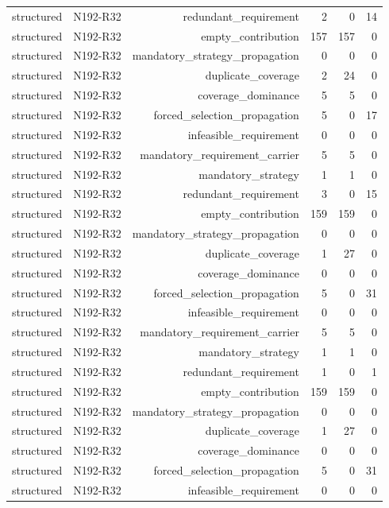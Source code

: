 {\begin{longtable}{lrrrrr}
structured & N192-R32 & redundant\_requirement & 2 & 0 & 14 \\
structured & N192-R32 & empty\_contribution & 157 & 157 & 0 \\
structured & N192-R32 & mandatory\_strategy\_propagation & 0 & 0 & 0 \\
structured & N192-R32 & duplicate\_coverage & 2 & 24 & 0 \\
structured & N192-R32 & coverage\_dominance & 5 & 5 & 0 \\
structured & N192-R32 & forced\_selection\_propagation & 5 & 0 & 17 \\
structured & N192-R32 & infeasible\_requirement & 0 & 0 & 0 \\
structured & N192-R32 & mandatory\_requirement\_carrier & 5 & 5 & 0 \\
structured & N192-R32 & mandatory\_strategy & 1 & 1 & 0 \\
structured & N192-R32 & redundant\_requirement & 3 & 0 & 15 \\
structured & N192-R32 & empty\_contribution & 159 & 159 & 0 \\
structured & N192-R32 & mandatory\_strategy\_propagation & 0 & 0 & 0 \\
structured & N192-R32 & duplicate\_coverage & 1 & 27 & 0 \\
structured & N192-R32 & coverage\_dominance & 0 & 0 & 0 \\
structured & N192-R32 & forced\_selection\_propagation & 5 & 0 & 31 \\
structured & N192-R32 & infeasible\_requirement & 0 & 0 & 0 \\
structured & N192-R32 & mandatory\_requirement\_carrier & 5 & 5 & 0 \\
structured & N192-R32 & mandatory\_strategy & 1 & 1 & 0 \\
structured & N192-R32 & redundant\_requirement & 1 & 0 & 1 \\
structured & N192-R32 & empty\_contribution & 159 & 159 & 0 \\
structured & N192-R32 & mandatory\_strategy\_propagation & 0 & 0 & 0 \\
structured & N192-R32 & duplicate\_coverage & 1 & 27 & 0 \\
structured & N192-R32 & coverage\_dominance & 0 & 0 & 0 \\
structured & N192-R32 & forced\_selection\_propagation & 5 & 0 & 31 \\
structured & N192-R32 & infeasible\_requirement & 0 & 0 & 0 \\

\end{longtable}}
